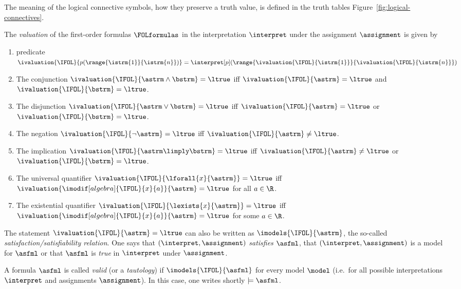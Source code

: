             The meaning of the logical connective symbols, how they preserve a truth value, is defined in the truth tables Figure~\ref{fig:logical-connectives}.
            \begin{definition}
                The \emph{valuation} of the first-order formulas $\FOLformulas$ in the interpretation $\interpret$ under the assignment $\assignment$ is given by
                \begin{enumerate}
                    \item predicate $\ivaluation{\IFOL}{p(\range{\istrm{1}}{\istrm{n}})} = \interpret[p](\range{\ivaluation{\IFOL}{\istrm{1}}}{\ivaluation{\IFOL}{\istrm{n}}})$
                    \item The conjunction $\ivaluation{\IFOL}{\astrm\land\bstrm} = \ltrue$ iff $\ivaluation{\IFOL}{\astrm}=\ltrue$ and $\ivaluation{\IFOL}{\bstrm}=\ltrue$.
                    \item The disjunction $\ivaluation{\IFOL}{\astrm\lor\bstrm} = \ltrue$ iff $\ivaluation{\IFOL}{\astrm}=\ltrue$ or $\ivaluation{\IFOL}{\bstrm}=\ltrue$.
                    \item The negation $\ivaluation{\IFOL}{\lnot\astrm} = \ltrue$ iff $\ivaluation{\IFOL}{\astrm} \neq \ltrue$.
                    \item The implication $\ivaluation{\IFOL}{\astrm\limply\bstrm} = \ltrue$ iff $\ivaluation{\IFOL}{\astrm} \neq \ltrue$ or $\ivaluation{\IFOL}{\bstrm}=\ltrue$.
                    \item The universal quantifier $\ivaluation{\IFOL}{\lforall{x}{\astrm}} = \ltrue$ iff $\ivaluation{\imodif[algebra]{\IFOL}{x}{a}}{\astrm} = \ltrue$ for all $a\in\R$.
                    \item The existential quantifier $\ivaluation{\IFOL}{\lexists{x}{\astrm}} = \ltrue$ iff $\ivaluation{\imodif[algebra]{\IFOL}{x}{a}}{\astrm} = \ltrue$ for some $a\in\R$.
                \end{enumerate}
                The statement $\ivaluation{\IFOL}{\astrm}=\ltrue$ can also be written as $\imodels{\IFOL}{\astrm}$, the so-called \emph{satisfaction/satisfiability relation}.
                One says that $(\interpret,\assignment)$ \emph{satisfies} $\asfml$, that $(\interpret,\assignment)$ is a model for $\asfml$ or that $\asfml$ is \emph{true} in $\interpret$ under $\assignment$.

                A formula $\asfml$ is called \emph{valid} (or a \emph{tautology}) if $\imodels{\IFOL}{\asfml}$ for every model $\model$ (i.e.\ for all possible interpretations $\interpret$ and assignments $\assignment$). In this case, one writes shortly $\models\asfml$.
            \end{definition}

